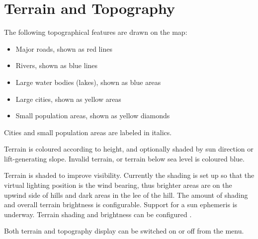 \section{Terrain and Topography}\label{sec:terrain_topo}

The following topographical features are drawn on the map:
\begin{itemize}
\item Major roads, shown as red lines
\item Rivers, shown as blue lines
\item Large water bodies (lakes), shown as blue areas
\item Large cities, shown as yellow areas
\item Small population areas, shown as yellow diamonds
\end{itemize}
Cities and small population areas are labeled in italics.

Terrain is coloured according to height, and optionally shaded by sun
direction or lift-generating slope.  Invalid terrain, or terrain below
sea level is coloured blue.

Terrain is shaded to improve visibility.  Currently the shading
is set up so that the virtual lighting position is the wind bearing,
thus brighter areas are on the upwind side of hills and dark areas in
the lee of the hill.  The amount of shading and overall terrain
brightness is configurable.  Support for a sun ephemeris is underway.
Terrain shading and brightness can be configured .

Both terrain and topography display can be switched on or off from the
menu.


